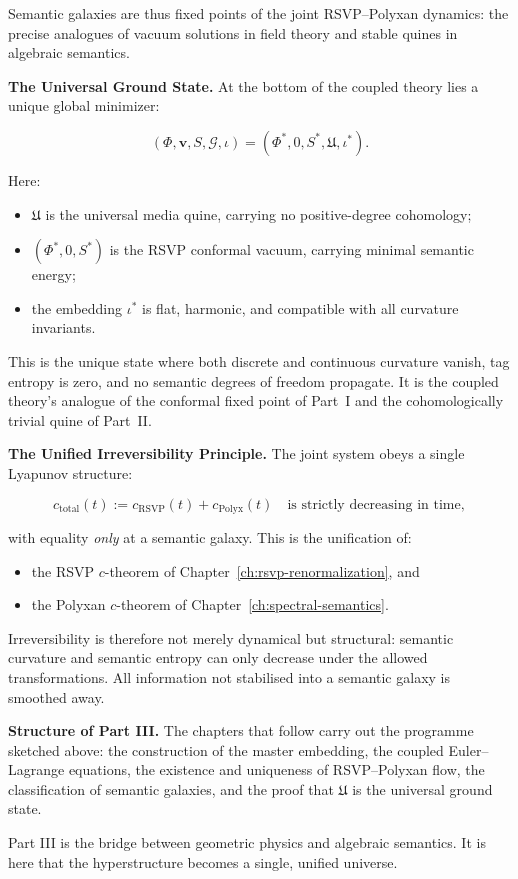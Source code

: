 \documentclass[../../main]{subfiles}
\begin{document}
Semantic galaxies are thus fixed points of the joint RSVP--Polyxan
dynamics: the precise analogues of vacuum solutions in field theory and
stable quines in algebraic semantics.

\medskip

\noindent
\textbf{The Universal Ground State.}  
At the bottom of the coupled theory lies a unique global minimizer:

\begin{equation}
(\Phi,\mathbf{v},S,\mathcal{G},\iota) = 
(\Phi^\ast,0,S^\ast,\mathfrak{U},\iota^\ast).
\end{equation}

Here:
\begin{itemize}
\item $\mathfrak{U}$ is the universal media quine, carrying no positive-degree
      cohomology;  
\item $(\Phi^\ast,0,S^\ast)$ is the RSVP conformal vacuum, carrying minimal
      semantic energy;  
\item the embedding $\iota^\ast$ is flat, harmonic, and compatible with
      all curvature invariants.
\end{itemize}

This is the unique state where both discrete and continuous curvature vanish,
tag entropy is zero, and no semantic degrees of freedom propagate.  
It is the coupled theory’s analogue of the conformal fixed point of Part~I
and the cohomologically trivial quine of Part~II.

\medskip

\noindent
\textbf{The Unified Irreversibility Principle.}  
The joint system obeys a single Lyapunov structure:

\[
c_{\mathrm{total}}(t)
  := c_{\mathrm{RSVP}}(t) + c_{\mathrm{Polyx}}(t)
  \quad\text{is strictly decreasing in time},
\]

with equality \emph{only} at a semantic galaxy.
This is the unification of:
\begin{itemize}
\item the RSVP $c$-theorem of Chapter~\ref{ch:rsvp-renormalization}, and  
\item the Polyxan $c$-theorem of Chapter~\ref{ch:spectral-semantics}.
\end{itemize}

Irreversibility is therefore not merely dynamical but structural:
semantic curvature and semantic entropy can only decrease under the
allowed transformations.  
All information not stabilised into a semantic galaxy is smoothed away.

\medskip

\noindent
\textbf{Structure of Part III.}  
The chapters that follow carry out the programme sketched above:
the construction of the master embedding, the coupled Euler--Lagrange
equations, the existence and uniqueness of RSVP--Polyxan flow, the
classification of semantic galaxies, and the proof that $\mathfrak{U}$
is the universal ground state.

Part III is the bridge between geometric physics and algebraic semantics.
It is here that the hyperstructure becomes a single, unified universe.
\end{document}
